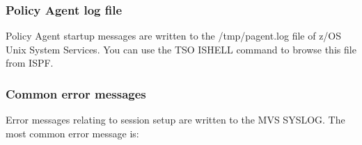 \documentclass[letterpaper,10pt,english]{sphinxmanual}
\begin{document}
\subsubsection{Policy Agent log file}
\label{\detokenize{Customization:policy-agent-log-file}}
\sphinxAtStartPar
Policy Agent startup messages are written to the /tmp/pagent.log file of z/OS Unix System Services. You can use the TSO ISHELL command to browse this file from ISPF.

\ignorespaces 

\subsubsection{Common error messages}
\label{\detokenize{Customization:common-error-messages}}\label{\detokenize{Customization:index-104}}
\sphinxAtStartPar
Error messages relating to session setup are written to the MVS SYSLOG. The most common error message is:

\begin{sphinxVerbatim}[commandchars=\\\{\}]
     
\end{sphinxVerbatim}
\end{document}
